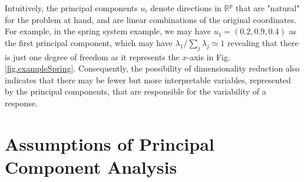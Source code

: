 \documentclass[12pt,letterpaper]{article}
\newcommand{\Rset}{\mathbb{R}}
\begin{document}
Intuitively, the principal components $u_i$ denote directions in $\Rset^p$ that are "natural" for the problem at hand, and are linear combinations of the original coordinates. For example, in the spring system example, we may  have $u_1 = (0.2, 0.9, 0.4)$ as the first principal component, which may have $\lambda_1/\sum_j \lambda_j \simeq 1$ revealing that there is just one degree of freedom as it represents the $x$-axis in Fig. \ref{fig.exampleSpring}. Consequently, the possibility of dimensionality reduction also indicates that there may be fewer but more interpretable variables, represented by the principal components, that are responsible for the variability of a response.

\section{Assumptions of Principal Component Analysis}
\end{document}
